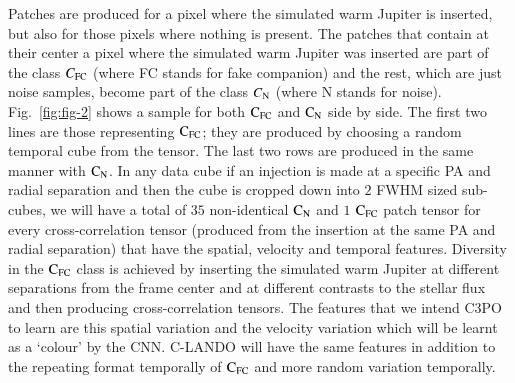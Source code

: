 \documentclass{aa}
\begin{document}
Patches are produced for a pixel where the simulated warm Jupiter is inserted, but also for those pixels where nothing is present.
The patches that contain at their center a pixel where the simulated warm Jupiter was inserted are part of the class $C_{\rm{FC}}$ (where FC stands for fake companion) and the rest, which are just noise samples, become part of the class $C_{\rm{N}}$ (where N stands for noise).
Fig.~\ref{fig:fig-2} shows a sample for both $\rm{C_{FC}}$ and $\rm{C_N}$ side by side.
The first two lines are those representing $\rm{C_{FC}}$; they are produced by choosing a random temporal cube from the tensor.
The last two rows are produced in the same manner with $\rm{C_N}$.
In any data cube if an injection is made at a specific PA and radial separation and then the cube is cropped down into $2$ FWHM sized sub-cubes, we will have a total of $35$ non-identical $\rm{C_N}$ and $1$ $\rm{C_{FC}}$ patch tensor for every cross-correlation tensor (produced from the insertion at the same PA and radial separation) that have the spatial, velocity and temporal features. 
Diversity in the $\rm{C_{FC}}$ class is achieved by inserting the simulated warm Jupiter at different separations from the frame center and at different contrasts to the stellar flux and then producing cross-correlation tensors.
The features that we intend C3PO to learn are this spatial variation and the velocity variation which will be learnt as a ‘colour’ by the CNN. 
C-LANDO will have the same features in addition to the repeating format temporally of $\rm{C_{FC}}$ and more random variation temporally.
\end{document}

